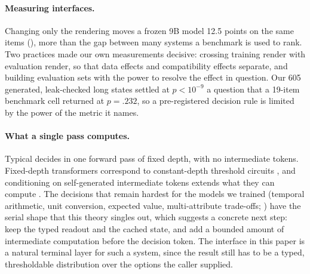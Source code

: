 \paragraph{Measuring interfaces.} Changing only the rendering moves a frozen 9B model 12.5 points on the
same items (), more than the gap between many systems a benchmark is used to
rank. Two practices made our own measurements decisive: crossing training render with evaluation
render, so that data effects and compatibility effects separate, and building evaluation sets with the
power to resolve the effect in question. Our 605 generated, leak-checked long states settled at
$p < 10^{-9}$ a question that a 19-item benchmark cell returned at $p = .232$, so a pre-registered
decision rule is limited by the power of the metric it names.

\paragraph{What a single pass computes.} Typical decides in one forward pass of fixed depth, with no
intermediate tokens. Fixed-depth transformers correspond to constant-depth threshold circuits
\citep{merrill2023parallelism}, and conditioning on self-generated intermediate tokens extends what they
can compute \citep{merrill2024expressive,feng2023chain}. The decisions that remain hardest for the models
we trained (temporal arithmetic, unit conversion, expected value, multi-attribute trade-offs;
) have the serial shape that this theory singles out, which suggests a concrete
next step: keep the typed readout and the cached state, and add a bounded amount of intermediate
computation before the decision token. The interface in this paper is a natural terminal layer for
such a system, since the result still has to be a typed, thresholdable distribution over the options
the caller supplied.
